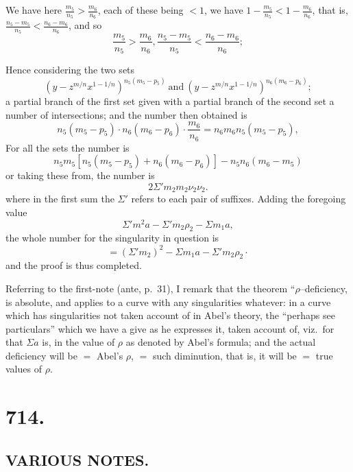 \documentclass[11pt,a4paper]{book}
\begin{document}

\newpage
We have here $\frac{m_5}{n_5}>\frac{m_6}{n_6}$, each of these being $<1$, we have $1-\frac{m_5}{n_5}<1-\frac{m_6}{n_6}$, that is, $\frac{n_5-m_5}{n_5}<\frac{n_6-m_6}{n_6}$, and so
\[
\frac{m_5}{n_5}>\frac{m_6}{n_6}, \frac{n_5-m_5}{n_5}<\frac{n_6-m_6}{n_6};
\]

Hence considering the two sets
\[
\left(y-z^{m/n}x^{1-1/n}\right)^{n_5(m_5-p_5)}\ \text{and}\ \left(y-z^{m/n}x^{1-1/n}\right)^{n_6(m_6-p_6)};
\]
a partial branch of the first set given with a partial branch of the second set a number of intersections; and the number then obtained is
\[
n_5(m_5-p_5)\cdot n_6(m_6-p_6)\cdot \frac{m_6}{n_6}=n_6 m_6 n_5(m_5-p_5),
\]
For all the sets the number is
\[
n_5 m_5 \left[n_5 (m_5-p_5)+ n_6(m_6-p_6) \right] - n_5 n_6 (m_6 - m_5)
\]
or taking these from, the number is
\[
2\Sigma'm_2 m_2 \nu_2 \nu_2.
\]
where in the first sum the $\Sigma'$ refers to each pair of suffixes. Adding the foregoing value
\[
\Sigma' m^2 a-\Sigma' m_2 \rho_2-\Sigma m_1 a,
\]
the whole number for the singularity in question is
\[
=(\Sigma' m_2)^2-\Sigma m_1 a-\Sigma' m_2 \rho_2 \cdot
\]
and the proof is thus completed.

Referring to the first-note (ante, p.~31), I remark that the theorem ``$\rho$--deficiency, is absolute, and applies to a curve with any singularities whatever: in a curve which has singularities not taken account of in Abel's theory, the ``perhaps see particulars'' which we have a give as he expresses it, taken account of, viz.\ for that $\Sigma a$ is, in the value of $\rho$ as denoted by Abel's formula; and the actual deficiency will be $=$ Abel's $\rho$, $=$ such diminution, that is, it will be $=$ true values of $\rho$.

\vspace{2em}
\noindent\dotfill

\newpage
\section*{714.}
\subsection*{VARIOUS NOTES.}
\end{document}
